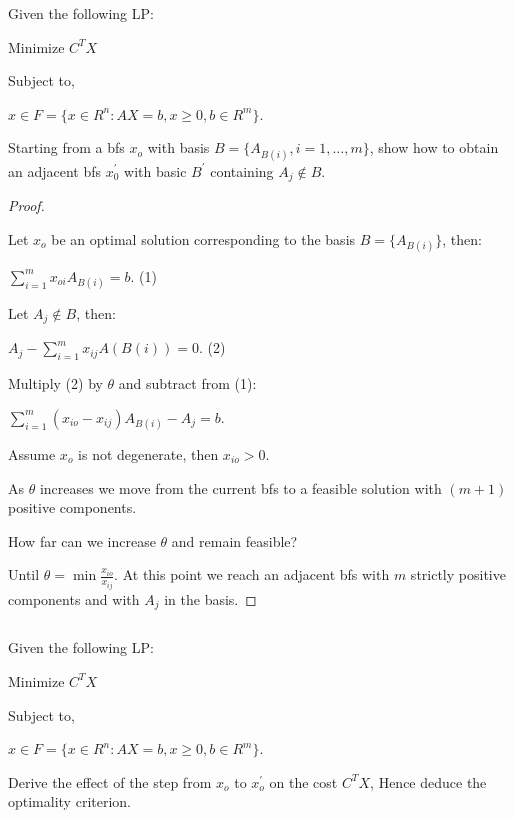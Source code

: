 \documentclass{article}
\begin{document}
\begin{customthm}{3}
  $ $

  Given the following LP: 
  
  \qquad Minimize $C^TX$ 
  
  Subject to, 
  
  \qquad $x \in F = \{x \in R^n: AX=b, x\geq 0, b\in R^m \}$.
  \newline

  \qquad Starting from a bfs $x_o$ with basis $B= \{A_{B(i)}, i=1,\ldots,m \}$, show how to obtain an adjacent bfs $x_0^\prime$ with basic $B^\prime$ containing $A_j \notin B$.

  \begin{proof}
    $ $

    Let $x_o$ be an optimal solution corresponding to the basis $B=\{A_{B(i)}\}$, then:

    \qquad $\sum_{i=1}^{m} x_{oi} A_{B(i)} = b$. \qquad (1)
    \newline

    Let $A_j \notin B$, then:

    \qquad $A_j - \sum_{i=1}^{m} x_{ij} A(B(i)) = 0$. \qquad (2)
    \newline

    Multiply (2) by $\theta$ and subtract from (1):

    \qquad $\sum_{i=1}^{m} (x_{io} - x_{ij})A_{B(i)} - A_j = b$.
    \newline

    Assume $x_o$ is not degenerate, then $x_{io} > 0$.
    \newline

    As $\theta$ increases we move from the current bfs to a feasible solution with $(m+1)$ positive components.
    \newline

    How far can we increase $\theta$ and remain feasible?
    \newline

    Until $\theta = \min \frac{x_{io}}{x_{ij}}$. 
    At this point we reach an adjacent bfs with $m$ strictly positive components and with $A_j$ in the basis.

  \end{proof}

\end{customthm}
\newpage

\begin{customthm}{4}
  $ $

  Given the following LP: 
  
  \qquad Minimize $C^TX$ 
  
  Subject to, 
  
  \qquad $x \in F = \{x \in R^n: AX=b, x\geq 0, b\in R^m \}$.
  \newline

  \qquad Derive the effect of the step from $x_o$ to  $x_o^\prime$ on the cost $C^TX$, Hence deduce the optimality criterion.

\end{customthm}
\end{document}
